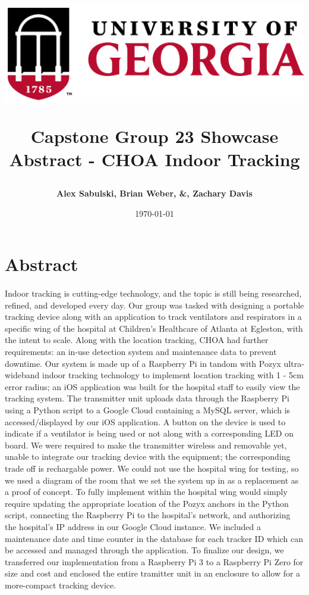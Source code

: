 \documentclass[12pt]{report}
\title{
	\begin{center}
		\includegraphics[scale=0.5]{uga.png}\\
 	\end{center}
 	Capstone Group 23
\bigbreak Showcase Abstract - CHOA Indoor Tracking
}
\author{\textbf{Alex Sabulski, Brian Weber, \&, Zachary Davis}}
\date{\today}
\begin{document}
\maketitle

\section*{Abstract}
	\paragraph{}
		Indoor tracking is cutting-edge technology, and the topic is still being researched, refined, and developed every day. Our group was tasked with designing a portable tracking device along with an application to track ventilators and respirators in a specific wing of the hospital at Children’s Healthcare of Atlanta at Egleston, with the intent to scale. Along with the location tracking, CHOA had further requirements: an in-use detection system and maintenance data to prevent downtime. Our system is made up of a Raspberry Pi in tandom with Pozyx ultra-wideband indoor tracking technology to implement location tracking with 1 - 5cm error radius; an iOS application was built for the hospital staff to easily view the tracking system. The transmitter unit uploads data through the Raspberry Pi using a Python script to a Google Cloud containing a MySQL server, which is accessed/displayed by our iOS application. A button on the device is used to indicate if a ventilator is being used or not along with a corresponding LED on board. We were required to make the transmitter wireless and removable yet, unable to integrate our tracking device with the equipment; the corresponding trade off is rechargable power. We could not use the hospital wing for testing, so we used a diagram of the room that we set the system up in as a replacement as a proof of concept. To fully implement within the hospital wing would simply require updating the appropriate location of the Pozyx anchors in the Python script, connecting the Raspberry Pi to the hospital’s network, and authorizing the hospital’s IP address in our Google Cloud instance. We included a maintenance date and time counter in the database for each tracker ID which can be accessed and managed through the application. To finalize our design, we transferred our implementation from a Raspberry Pi 3 to a Raspberry Pi Zero for size and cost and enclosed the entire tramitter unit in an enclosure to allow for a more-compact tracking device.
\end{document}
